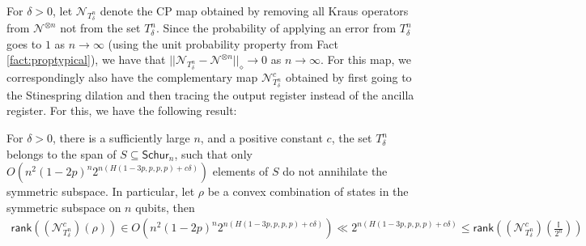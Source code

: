 \documentclass[11pt]{article}
\begin{document}
For $\delta > 0$, let $\mathcal N_{T^n_\delta}$ denote the CP map obtained by removing all Kraus operators from $\mathcal N^{\otimes n}$ not from the set $T_\delta^n$. Since the probability of applying an error from $T_{\delta}^n$ goes to $1$ as $n\to \infty$ (using the unit probability property from Fact \ref{fact:proptypical}), we have that $\vert\vert\mathcal N_{T^n_\delta}-\mathcal N^{\otimes n}\vert \vert_{\diamond}\to 0$ as $n \to \infty$. For this map, we correspondingly also have the complementary map $\mathcal N^c_{T^n_\delta}$ obtained by first going to the Stinespring dilation and then tracing the output register instead of the ancilla register. For this, we have the following result:


\begin{theorem}\label{thm:rank}
    For $\delta > 0$, there is a sufficiently large $n$, and a positive constant $c$, the set $T_{\delta}^n$ belongs to the span of $S \subseteq \mathsf{Schur}_n$, such that only $O\left(n^2(1-2p)^n2^{n(H(1-3p, p, p, p)+c\delta)}\right)$ elements of $S$ do not annihilate the symmetric subspace. In particular, let $\rho$ be a convex combination of states in the symmetric subspace on $n$ qubits, then
    \begin{align*}
       \mathsf{rank}((\mathcal{N}^c_{T^n_\delta})(\rho)) \in O\left(n^2(1-2p)^n2^{n(H(1-3p, p, p, p) + c\delta)}\right)
        \ll 2^{n(H(1-3p, p, p, p) + c\delta)}
        \leq \mathsf{rank}\left((\mathcal{N}^c_{T^n_\delta})\left(\frac{\mathbb{I}}{2^n}\right)\right)
    \end{align*}
\end{theorem}
\end{document}
